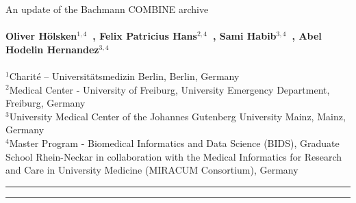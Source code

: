 \begin{titlepage}
{\noindent\huge{An update of the Bachmann COMBINE archive}}
\\ \\
\noindent\textbf{Oliver H\"olsken$^{1,4}$~, Felix Patricius Hans$^{2,4}$~, Sami Habib$^{3,4}$~, Abel Hodelin Hernandez$^{3,4}$~}
\\ \\
	\small $^{1}$Charité – Universitätsmedizin Berlin, Berlin, Germany \\
	\small $^{2}$Medical Center - University of Freiburg, University Emergency Department, Freiburg, Germany \\
	\small $^{3}$University Medical Center of the Johannes Gutenberg University Mainz, Mainz, Germany \\
	\small $^{4}$Master Program - Biomedical Informatics and Data Science (BIDS), Graduate School Rhein-Neckar in collaboration with the Medical Informatics for Research and Care in University Medicine (MIRACUM Consortium), Germany \\

\hrule

 \hspace{10pt}

\noindent{}

\hrule
\end{titlepage}
